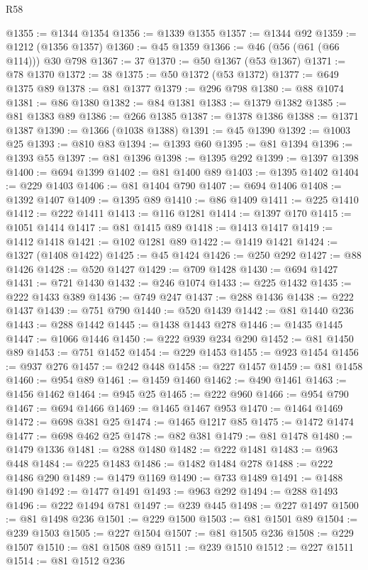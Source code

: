 \begin{lexlean}{R58}
\begin{coremodule}
@1355 := @1344 @1354
@1356 := @1339 @1355
@1357 := @1344 @92
@1359 := @1212 (@1356 @1357)
@1360 := @45 @1359
@1366 := @46 (@56 (@61 (@66 @114))) @30 @798
@1367 := 37
@1370 := @50 @1367 (@53 @1367)
@1371 := @78 @1370
@1372 := 38
@1375 := @50 @1372 (@53 @1372)
@1377 := @649 @1375 @89
@1378 := @81 @1377
@1379 := @296 @798
@1380 := @88 @1074
@1381 := @86 @1380
@1382 := @84 @1381
@1383 := @1379 @1382
@1385 := @81 @1383 @89
@1386 := @266 @1385
@1387 := @1378 @1386
@1388 := @1371 @1387
@1390 := @1366 (@1038 @1388)
@1391 := @45 @1390
@1392 := @1003 @25
@1393 := @810 @83
@1394 := @1393 @60
@1395 := @81 @1394
@1396 := @1393 @55
@1397 := @81 @1396
@1398 := @1395 @292
@1399 := @1397 @1398
@1400 := @694 @1399
@1402 := @81 @1400 @89
@1403 := @1395 @1402
@1404 := @229 @1403
@1406 := @81 @1404 @790
@1407 := @694 @1406
@1408 := @1392 @1407
@1409 := @1395 @89
@1410 := @86 @1409
@1411 := @225 @1410
@1412 := @222 @1411
@1413 := @116 @1281
@1414 := @1397 @170
@1415 := @1051 @1414
@1417 := @81 @1415 @89
@1418 := @1413 @1417
@1419 := @1412 @1418
@1421 := @102 @1281 @89
@1422 := @1419 @1421
@1424 := @1327 (@1408 @1422)
@1425 := @45 @1424
@1426 := @250 @292
@1427 := @88 @1426
@1428 := @520 @1427
@1429 := @709 @1428
@1430 := @694 @1427
@1431 := @721 @1430
@1432 := @246 @1074
@1433 := @225 @1432
@1435 := @222 @1433 @389
@1436 := @749 @247
@1437 := @288 @1436
@1438 := @222 @1437
@1439 := @751 @790
@1440 := @520 @1439
@1442 := @81 @1440 @236
@1443 := @288 @1442
@1445 := @1438 @1443 @278
@1446 := @1435 @1445
@1447 := @1066 @1446
@1450 := @222 @939 @234 @290
@1452 := @81 @1450 @89
@1453 := @751 @1452
@1454 := @229 @1453
@1455 := @923 @1454
@1456 := @937 @276
@1457 := @242 @448
@1458 := @227 @1457
@1459 := @81 @1458
@1460 := @954 @89
@1461 := @1459 @1460
@1462 := @490 @1461
@1463 := @1456 @1462
@1464 := @945 @25
@1465 := @222 @960
@1466 := @954 @790
@1467 := @694 @1466
@1469 := @1465 @1467 @953
@1470 := @1464 @1469
@1472 := @698 @381 @25
@1474 := @1465 @1217 @85
@1475 := @1472 @1474
@1477 := @698 @462 @25
@1478 := @82 @381
@1479 := @81 @1478
@1480 := @1479 @1336
@1481 := @288 @1480
@1482 := @222 @1481
@1483 := @963 @448
@1484 := @225 @1483
@1486 := @1482 @1484 @278
@1488 := @222 @1486 @290
@1489 := @1479 @1169
@1490 := @733 @1489
@1491 := @1488 @1490
@1492 := @1477 @1491
@1493 := @963 @292
@1494 := @288 @1493
@1496 := @222 @1494 @781
@1497 := @239 @445
@1498 := @227 @1497
@1500 := @81 @1498 @236
@1501 := @229 @1500
@1503 := @81 @1501 @89
@1504 := @239 @1503
@1505 := @227 @1504
@1507 := @81 @1505 @236
@1508 := @229 @1507
@1510 := @81 @1508 @89
@1511 := @239 @1510
@1512 := @227 @1511
@1514 := @81 @1512 @236

\end{coremodule}
\end{lexlean}
